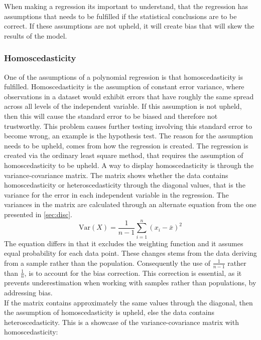 When making a regression its important to understand, that the regression has assumptions that needs to be fulfilled if the statistical conclusions are to be correct. If these assumptions are not upheld, it will create bias that will skew the results of the model.
\subsubsection{Homoscedasticity}
One of the assumptions of a polynomial regression is that homoscedasticity is fulfilled. Homoscedasticity is the assumption of constant error variance, where observations in a dataset would exhibit errors that have roughly the same spread across all levels of the independent variable.
\newline
If this assumption is not upheld, then this will cause the standard error to be biased and therefore not trustworthy. This problem causes further testing involving this standard error to become wrong, an example is the hypothesis test.
\newline
The reason for the assumption needs to be upheld, comes from how the regression is created. The regression is created via the ordinary least square method, that requires the assumption of homoscedasticity to be upheld.
\newline
A way to display homoscedasticity is through the variance-covariance matrix. The matrix shows whether the data contains homoscedasticity or heteroscedasticity through the diagonal values, that is the variance for the error in each independent variable in the regression. The variances in the matrix are calculated through an alternate equation from the one presented in \autoref{sec:disc}.
\begin{equation}
	\text{Var}(X) = \frac{1}{n - 1} \sum_{i=1}^{n} (x_i - \bar{x})^2
\end{equation}
The equation differs in that it excludes the weighting function and it assumes equal probability for each data point. These changes stems from the data deriving from a sample rather than the population. Consequently the use of $\frac{1}{n-1}$ rather than $\frac{1}{n}$, is to account for the bias correction. This correction is essential, as it prevents underestimation when working with samples rather than populations, by addressing bias.\\
If the matrix contains approximately the same values through the diagonal, then the assumption of homoscedasticity is upheld, else the data contains heteroscedasticity. This is a showcase of the variance-covariance matrix with homoscedasticity:


